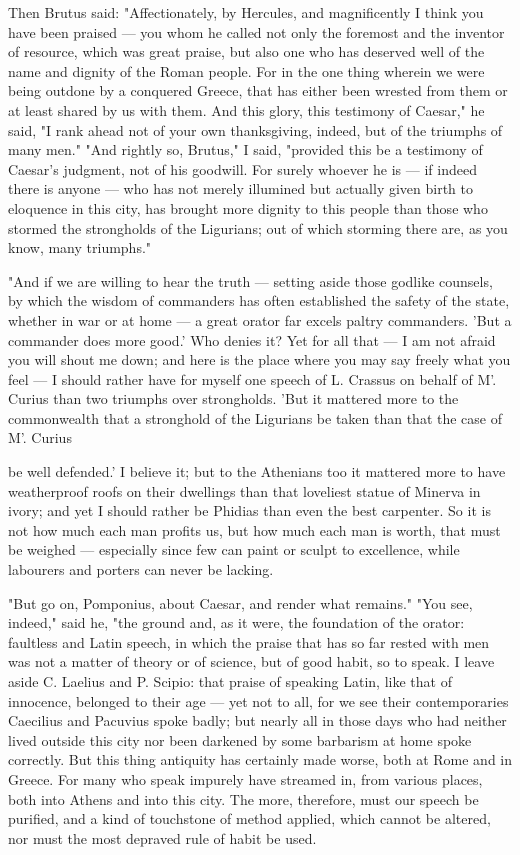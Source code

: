  Then Brutus said: "Affectionately, by Hercules, and magnificently I think you have been praised — you whom he called not only the foremost and the inventor of resource, which was great praise, but also one who has deserved well of the name and dignity of the Roman people. For in the one thing wherein we were being outdone by a conquered Greece, that has either been wrested from them or at least shared by us with them. And this glory, this testimony of Caesar," he said, "I rank ahead not of your own thanksgiving, indeed, but of the triumphs of many men." "And rightly so, Brutus," I said, "provided this be a testimony of Caesar's judgment, not of his goodwill. For surely whoever he is — if indeed there is anyone — who has not merely illumined but actually given birth to eloquence in this city, has brought more dignity to this people than those who stormed the strongholds of the Ligurians; out of which storming there are, as you know, many triumphs."

 "And if we are willing to hear the truth — setting aside those godlike counsels, by which the wisdom of commanders has often established the safety of the state, whether in war or at home — a great orator far excels paltry commanders. 'But a commander does more good.' Who denies it? Yet for all that — I am not afraid you will shout me down; and here is the place where you may say freely what you feel — I should rather have for myself one speech of L. Crassus on behalf of M'. Curius than two triumphs over strongholds. 'But it mattered more to the commonwealth that a stronghold of the Ligurians be taken than that the case of M'. Curius

 be well defended.' I believe it; but to the Athenians too it mattered more to have weatherproof roofs on their dwellings than that loveliest statue of Minerva in ivory; and yet I should rather be Phidias than even the best carpenter. So it is not how much each man profits us, but how much each man is worth, that must be weighed — especially since few can paint or sculpt to excellence, while labourers and porters can never be lacking.

 "But go on, Pomponius, about Caesar, and render what remains." "You see, indeed," said he, "the ground and, as it were, the foundation of the orator: faultless and Latin speech, in which the praise that has so far rested with men was not a matter of theory or of science, but of good habit, so to speak. I leave aside C. Laelius and P. Scipio: that praise of speaking Latin, like that of innocence, belonged to their age — yet not to all, for we see their contemporaries Caecilius and Pacuvius spoke badly; but nearly all in those days who had neither lived outside this city nor been darkened by some barbarism at home spoke correctly. But this thing antiquity has certainly made worse, both at Rome and in Greece. For many who speak impurely have streamed in, from various places, both into Athens and into this city. The more, therefore, must our speech be purified, and a kind of touchstone of method applied, which cannot be altered, nor must the most depraved rule of habit be used.

